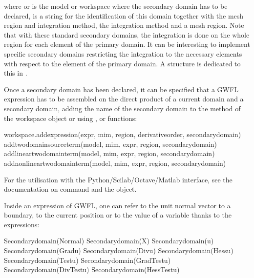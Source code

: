 \documentclass[a4paper,11pt,english]{sphinxmanual}
\begin{document}
where  or  is the model or workspace where the secondary domain has to be declared,  is a string for the identification of this domain together with the mesh region and integration method,  the integration method and  a mesh region. Note that with these standard secondary domains, the integration is done on the whole region for each element of the primary domain. It can be interesting to implement specific secondary domains restricting the integration to the necessary elements with respect to the element of the primary domain. A structure is dedicated to this in .

Once a secondary domain has been declared, it can be specified that a GWFL expression has to be assembled on the direct product of a current domain and a secondary domain, adding the name of the secondary domain to the  method of the workspace object or using ,  or  functions:

\begin{sphinxVerbatim}[commandchars=\\\{\}]
workspace.add\PYGZus{}expression(expr, mim, region, derivative\PYGZus{}order, secondary\PYGZus{}domain)
add\PYGZus{}twodomain\PYGZus{}source\PYGZus{}term(model, mim, expr, region, secondary\PYGZus{}domain)
add\PYGZus{}linear\PYGZus{}twodomain\PYGZus{}term(model, mim, expr, region, secondary\PYGZus{}domain)
add\PYGZus{}nonlinear\PYGZus{}twodomain\PYGZus{}term(model, mim, expr, region, secondary\PYGZus{}domain)
\end{sphinxVerbatim}

For the utilisation with the Python/Scilab/Octave/Matlab interface, see the documentation on  command and the  object.

Inside an expression of GWFL, one can refer to the unit normal vector to a boundary, to the current position or to the value of a variable thanks to the expressions:

\begin{sphinxVerbatim}[commandchars=\\\{\}]
Secondary\PYGZus{}domain(Normal)
Secondary\PYGZus{}domain(X)
Secondary\PYGZus{}domain(u)
Secondary\PYGZus{}domain(Grad\PYGZus{}u)
Secondary\PYGZus{}domain(Div\PYGZus{}u)
Secondary\PYGZus{}domain(Hess\PYGZus{}u)
Secondary\PYGZus{}domain(Test\PYGZus{}u)
Secondary\PYGZus{}domain(Grad\PYGZus{}Test\PYGZus{}u)
Secondary\PYGZus{}domain(Div\PYGZus{}Test\PYGZus{}u)
Secondary\PYGZus{}domain(Hess\PYGZus{}Test\PYGZus{}u)
\end{sphinxVerbatim}
\end{document}
